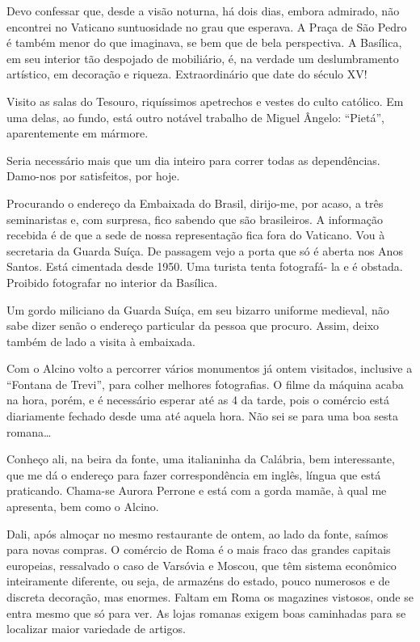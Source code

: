 Devo confessar que, desde a visão noturna, há dois dias, embora admirado, não encontrei no Vaticano suntuosidade no grau que esperava. A Praça de São Pedro é também menor do que imaginava, se bem que de bela perspectiva. A Basílica, em seu interior tão despojado de mobiliário, é, na verdade um deslumbramento artístico, em decoração e riqueza. Extraordinário que date do século XV!

Visito as salas do Tesouro, riquíssimos apetrechos e vestes do culto católico. Em uma delas, ao fundo, está outro notável trabalho de Miguel Ângelo: ``Pietá'', aparentemente em mármore.

Seria necessário mais que um dia inteiro para correr todas as dependências. Damo-nos por satisfeitos, por hoje.

Procurando o endereço da Embaixada do Brasil, dirijo-me, por acaso, a três seminaristas e, com surpresa, fico sabendo que são brasileiros. A informação recebida é de que a sede de nossa representação fica fora do Vaticano. Vou à secretaria da Guarda Suíça. De passagem vejo a porta que só é aberta nos Anos Santos. Está cimentada desde 1950. Uma turista tenta fotografá- la e é obstada. Proibido fotografar no interior da Basílica.

Um gordo miliciano da Guarda Suíça, em seu bizarro uniforme medieval, não sabe dizer senão o endereço particular da pessoa que procuro. Assim, deixo também de lado a visita à embaixada.

Com o Alcino volto a percorrer vários monumentos já ontem visitados, inclusive a ``Fontana de Trevi'', para colher melhores fotografias. O filme da máquina acaba na hora, porém, e é necessário esperar até as 4 da tarde, pois o comércio está diariamente fechado desde uma até aquela hora. Não sei se para uma boa sesta romana\ldots

Conheço ali, na beira da fonte, uma italianinha da Calábria, bem interessante, que me dá o endereço para fazer correspondência em inglês, língua que está praticando. Chama-se Aurora Perrone e está com a gorda mamãe, à qual me apresenta, bem como o Alcino.

Dali, após almoçar no mesmo restaurante de ontem, ao lado da fonte, saímos para novas compras. O comércio de Roma é o mais fraco das grandes capitais europeias, ressalvado o caso de Varsóvia e Moscou, que têm sistema econômico inteiramente diferente, ou seja, de armazéns do estado, pouco numerosos e de discreta decoração, mas enormes. Faltam em Roma os magazines vistosos, onde se entra mesmo que só para ver. As lojas romanas exigem boas caminhadas para se localizar maior variedade de artigos.

